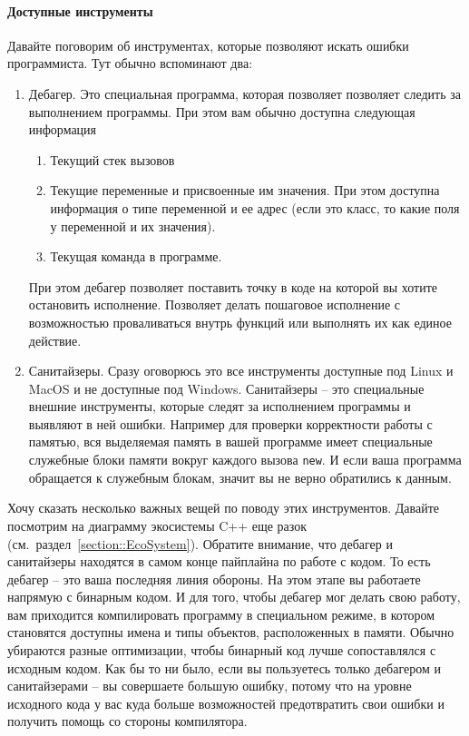 \paragraph{Доступные инструменты}

Давайте поговорим об инструментах, которые позволяют искать ошибки программиста.
Тут обычно вспоминают два:
\begin{enumerate}
\item Дебагер.
Это специальная программа, которая позволяет позволяет следить за выполнением программы.
При этом вам обычно доступна следующая информация
\begin{enumerate}
\item Текущий стек вызовов

\item Текущие переменные и присвоенные им значения.
При этом доступна информация о типе переменной и ее адрес (если это класс, то какие поля у переменной и их значения).

\item Текущая команда в программе.
\end{enumerate}
При этом дебагер позволяет поставить точку в коде на которой вы хотите остановить исполнение.
Позволяет делать пошаговое исполнение с возможностью проваливаться внутрь функций или выполнять их как единое действие.

\item Санитайзеры.
Сразу оговорюсь это все инструменты доступные под Linux и MacOS и не доступные под Windows.
Санитайзеры -- это специальные внешние инструменты, которые следят за исполнением программы и выявляют в ней ошибки.
Например для проверки корректности работы с памятью, вся выделяемая память в вашей программе имеет специальные служебные блоки памяти вокруг каждого вызова \verb"new".
И если ваша программа обращается к служебным блокам, значит вы не верно обратились к данным.
\end{enumerate}
Хочу сказать несколько важных вещей по поводу этих инструментов.
Давайте посмотрим на диаграмму экосистемы C++ еще разок (см.~раздел~\ref{section::EcoSystem}).
Обратите внимание, что дебагер и санитайзеры находятся в самом конце пайплайна по работе с кодом.
То есть дебагер -- это ваша последняя линия обороны.
На этом этапе вы работаете напрямую с бинарным кодом.
И для того, чтобы дебагер мог делать свою работу, вам приходится компилировать программу в специальном режиме, в котором становятся доступны имена и типы объектов, расположенных в памяти.
Обычно убираются разные оптимизации, чтобы бинарный код лучше сопоставлялся с исходным кодом.
Как бы то ни было, если вы пользуетесь только дебагером и санитайзерами -- вы совершаете большую ошибку, потому что на уровне исходного кода у вас куда больше возможностей предотвратить свои ошибки и получить помощь со стороны компилятора.

